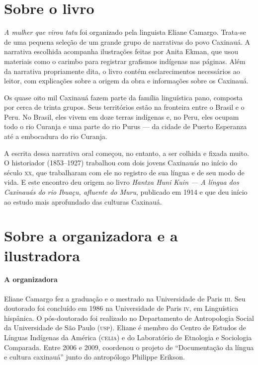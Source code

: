 \documentclass[11pt]{extarticle}
\begin{document}
\section{Sobre o livro} 

\textit{A mulher que virou tatu} foi organizado pela linguista Eliane Camargo. Trata-se de uma pequena seleção de um grande grupo de narrativas do povo Caxinauá. 
A narrativa escolhida acompanha ilustrações feitas por Anita Ekman, que usou materiais como o carimbo para registrar grafismos indígenas nas páginas. Além da narrativa propriamente dita, o livro contém esclarecimentos necessários ao leitor, com explicações sobre a origem da obra e informações sobre os Caxinauá.


Os quase oito mil Caxinauá fazem parte da família linguística pano, composta por cerca de trinta grupos. Seus territórios estão na fronteira entre o Brasil e o Peru. No Brasil, eles vivem em doze terras indígenas e, no Peru, eles ocupam todo o rio Curanja e uma parte do rio Purus --- da cidade de Puerto Esperanza até a embocadura do rio Curanja. 

A escrita dessa narrativa oral começou, no entanto, a ser colhida e fixada muito. O historiador (1853--1927) trabalhou com dois jovens Caxinauás no início do século \textsc{xx}, que trabalharam com ele no registro de sua língua e de seu modo de vida. E este encontro deu origem ao livro \textit{Hantxa Huni Kuin --- A língua dos Caxinauás do rio Ibuaçu, afluente do Muru}, publicado em 1914 e que deu início ao estudo mais aprofundado das culturas Caxinauá. 

\section{Sobre a organizadora e a ilustradora}

\paragraph{A organizadora} Eliane Camargo fez a graduação e o mestrado na Universidade de Paris \textsc{iii}. Seu doutorado foi concluído em 1986 na Universidade de Paris \textsc{iv}, em Linguística hispânica. O pós-doutorado foi realizado no Departamento de Antropologia Social da Universidade de São Paulo (\textsc{usp}). Eliane é membro do Centro de Estudos de Línguas Indígenas da América (\textsc{celia}) e do Laboratório de Etnologia e Sociologia Comparada. Entre 2006 e 2009, coordenou o projeto de ``Documentação da língua e cultura caxinauá'' junto do antropólogo Philippe Erikson.
\end{document}
